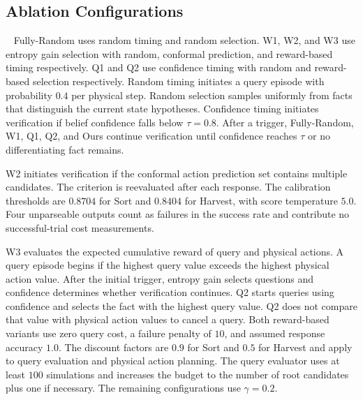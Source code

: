 \subsection{Ablation Configurations}~\label{appx:ablation_configs}
Fully-Random uses random timing and random selection. W1, W2, and W3 use entropy gain selection with random, conformal prediction, and reward-based timing respectively. Q1 and Q2 use confidence timing with random and reward-based selection respectively. Random timing initiates a query episode with probability $0.4$ per physical step. Random selection samples uniformly from facts that distinguish the current state hypotheses. Confidence timing initiates verification if belief confidence falls below $\tau=0.8$. After a trigger, Fully-Random, W1, Q1, Q2, and Ours continue verification until confidence reaches $\tau$ or no differentiating fact remains.

W2 initiates verification if the conformal action prediction set contains multiple candidates. The criterion is reevaluated after each response. The calibration thresholds are $0.8704$ for Sort and $0.8404$ for Harvest, with score temperature $5.0$. Four unparseable outputs count as failures in the success rate and contribute no successful-trial cost measurements.

W3 evaluates the expected cumulative reward of query and physical actions. A query episode begins if the highest query value exceeds the highest physical action value. After the initial trigger, entropy gain selects questions and confidence determines whether verification continues. Q2 starts queries using confidence and selects the fact with the highest query value. Q2 does not compare that value with physical action values to cancel a query. Both reward-based variants use zero query cost, a failure penalty of $10$, and assumed response accuracy $1.0$. The discount factors are $0.9$ for Sort and $0.5$ for Harvest and apply to query evaluation and physical action planning. The query evaluator uses at least $100$ simulations and increases the budget to the number of root candidates plus one if necessary. The remaining configurations use $\gamma=0.2$.


